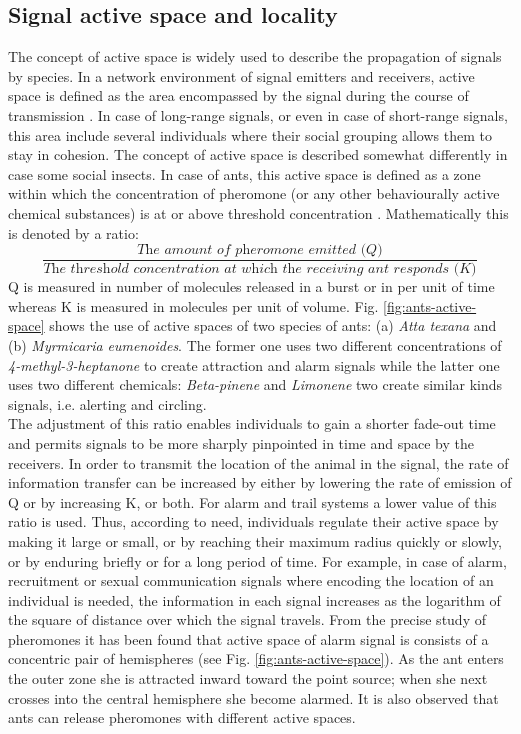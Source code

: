 \subsection{Signal active space and locality}
The concept of active space is widely used to describe the propagation of signals by species. In a network environment of signal emitters and receivers, active space is defined as the area encompassed by the signal during the course of transmission \cite{Mcgregor2000}. In case of long-range signals, or even in case of short-range signals, this area include several individuals where their social grouping allows them to stay in cohesion. The concept of active space is described somewhat differently in case some social insects. In case of ants, this active space is defined as a zone within which the concentration of pheromone (or any other behaviourally active chemical substances) is at or above threshold concentration \cite{Holldobler1990}. Mathematically this is denoted by a ratio:
\begin{equation}
\frac{\textit{The amount of pheromone emitted (Q)}}{\textit{The threshold concentration at which the receiving ant responds (K)}}
\end{equation}
Q is measured in number of molecules released in a burst or in per unit of time whereas K is measured in molecules per unit of volume. 
Fig. \ref{fig:ants-active-space} shows the use of active spaces of two species of ants: (a) {\em Atta texana} and (b) {\em Myrmicaria eumenoides}.  The former one uses two different concentrations of {\em 4-methyl-3-heptanone} to create attraction and alarm signals while the latter one uses two different chemicals: {\em Beta-pinene} and {\em Limonene} two create similar kinds signals, i.e. alerting and circling.\\ 
The adjustment of this ratio enables individuals to gain a shorter fade-out time and permits signals to be more sharply pinpointed in time and space by the receivers. In order to transmit the location of the animal in the signal, the rate of information transfer can be increased by either by lowering the rate of emission of Q or by increasing K, or both. For alarm and trail systems a lower value of this ratio is used. Thus, according to need, individuals regulate their active space by making it large or small, or by reaching their maximum radius quickly or slowly, or by enduring briefly or for a long period of time. For example, in case of alarm, recruitment or sexual communication signals where encoding the location of an individual is needed, the information in each signal increases as the logarithm of the square of distance over which the signal travels. From the precise study of pheromones it has been found that active space of alarm signal is consists of a concentric pair of hemispheres (see Fig. \ref{fig:ants-active-space}). As the ant enters the outer zone she is attracted inward toward the point source; when she next crosses into the central hemisphere she become alarmed. It is also observed that ants can release pheromones with different active spaces.\\
